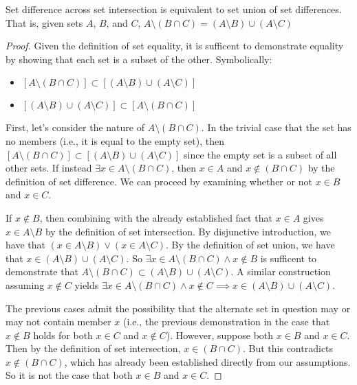 \documentclass[main.tex]{subfiles}
\begin{document}
\begin{thm}
	Set difference across set intersection is equivalent to set union of set
	differences. That is, given sets \(A\), \(B\), and \(C\),
	\(A \setminus (B \cap C) = (A \setminus B) \cup (A \setminus C)\)
\end{thm}
\begin{proof}
	Given the definition of set equality, it is sufficent to demonstrate
	equality by showing that each set is a subset of the other. Symbolically:
	\begin{itemize}
		\item \([A \setminus (B \cap C)] \subset [(A \setminus B) \cup (A \setminus C)]\)
		\item \([(A \setminus B) \cup (A \setminus C)] \subset [A \setminus (B \cap C)]\)
	\end{itemize}

	\medskip
	First, let's consider the nature of \(A \setminus (B \cap C)\). In the
	trivial case that the set has no members (i.e., it is equal to the
	empty set), then
	\([A \setminus (B \cap C)] \subset [(A \setminus B) \cup (A \setminus C)]\)
	since the empty set is a subset of all other sets. If instead
	\(\exists x \in A \setminus (B \cap C)\), then \(x \in A\) and
	\(x \notin (B \cap C)\) by the definition of set difference. We can
	proceed by examining whether or not \(x \in B\) and \(x \in C\).

	If \(x \notin B\), then combining with the already established fact that
	\(x \in A\) gives \(x \in A \setminus B\) by the definition of set
	intersection. By disjunctive introduction, we have that
	\((x \in A \setminus B) \lor (x \in A \setminus C)\). By the definition
	of set union, we have that
	\(x \in (A \setminus B) \cup (A \setminus C)\). So
	\(\exists x \in A \setminus (B \cap C) \land x \notin B\) is sufficent
	to demonstrate that
	\(A \setminus (B \cap C) \subset (A \setminus B) \cup (A \setminus C)\).
	A similar construction assuming \(x \notin C\) yields
	\(\exists x \in A \setminus (B \cap C) \land x \notin C \implies
	x \in (A \setminus B) \cup (A \setminus C)\).

	The previous cases admit the possibility that the alternate set in
	question may or may not contain member \(x\) (i.e., the previous
	demonstration in the case that \(x \notin B\) holds for both \(x \in C\)
	and \(x \notin C\)). However, suppose both \(x \in B\) and \(x \in C\).
	Then by the definition of set intersection, \(x \in (B \cap C)\). But
	this contradicts \(x \notin (B \cap C)\), which has already been
	established directly from our assumptions. So it is not the case that
	both \(x \in B\) and \(x \in C\).


\end{proof}
\end{document}
